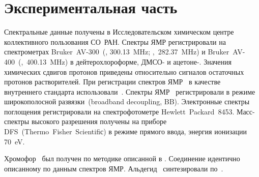 \section{Экспериментальная часть}

Спектральные данные получены в Исследовательском химическом центре коллективного пользования СО~РАН. 
Спектры ЯМР регистрировали на спектрометрах Bruker~AV-300~(, \SI{300.13}{\mega\hertz}; ,~\SI{282.37}{\mega\hertz}) и Bruker~AV-400~(,~\SI{400.13}{\mega\hertz}) в дейтерохлороформе, ДМСО- и ацетоне-. 
Значения химических сдвигов протонов приведены относительно сигналов остаточных протонов растворителей. 
При регистрации спектров ЯМР~ в качестве внутреннего стандарта использовали~. 
Спектры ЯМР~ регистрировали в режиме широкополосной развязки~(broadband decoupling, BB). 
Электронные спектры поглощения регистрировали на спектрофотометре Hewlett~Packard~8453.
Масс-спектры высокого разрешения получены на приборе DFS~(Thermo~Fisher~Scientifiс) в режиме прямого ввода, энергия ионизации \SI{70}{\electronvolt}.

Хромофор~ был получен по методике описанной в \cite{Jang2006}. Соединение идентично описанному по данным спектров ЯМР.
Альдегид~ синтезировали по~\cite{2016a,2010}.


